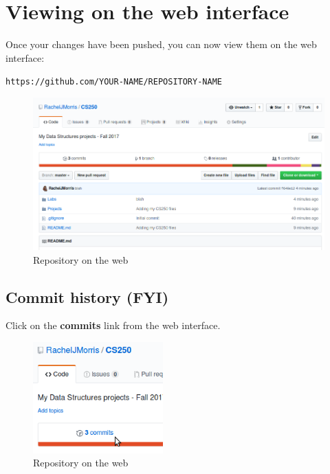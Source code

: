 \documentclass[a4paper,12pt,oneside]{book}
\begin{document}
    \newpage

    \section{Viewing on the web interface}

        Once your changes have been pushed, you can now view them on the
        web interface:

        \begin{center}
        \texttt{https://github.com/YOUR-NAME/REPOSITORY-NAME}
        \end{center}
        
        \begin{figure}[h]
            \centering
            \includegraphics[width=14cm]{images/github-webrepo.png}
            \caption{Repository on the web}
        \end{figure}

        \subsection{Commit history (FYI)}

        Click on the \textbf{commits} link from the web interface.

        \begin{figure}[h]
            \centering
            \includegraphics[width=5cm]{images/github-commits.png}
            \caption{Repository on the web}
        \end{figure}
        
\end{document}
